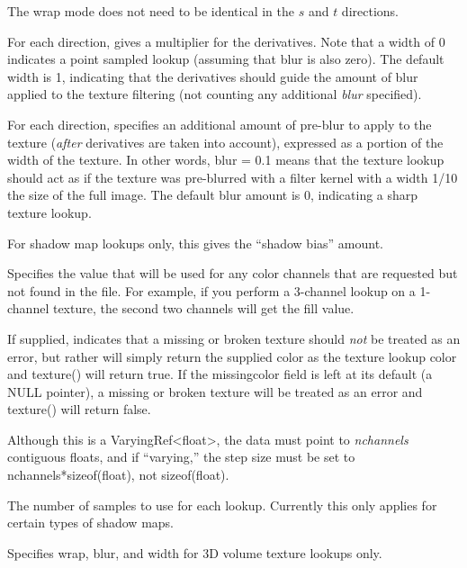 The wrap mode does not need to be identical in the $s$ and $t$
directions.
\apiend

For each direction, gives a multiplier for the derivatives.  Note that
a width of 0 indicates a point sampled lookup (assuming that blur is
also zero).  The default width is 1, indicating that the derivatives
should guide the amount of blur applied to the texture filtering (not
counting any additional \emph{blur} specified).
\apiend

For each direction, specifies an additional amount of pre-blur to apply
to the texture (\emph{after} derivatives are taken into account),
expressed as a portion of the width of the texture.  In other words,
blur = 0.1 means that the texture lookup should act as if the texture
was pre-blurred with a filter kernel with a width 1/10 the size of the
full image.  The default blur amount is 0, indicating a sharp texture
lookup.
\apiend

For shadow map lookups only, this gives the ``shadow bias'' amount.
\apiend

Specifies the value that will be used for any color channels that are
requested but not found in the file.  For example, if you perform a
3-channel lookup on a 1-channel texture, the second two channels will
get the fill value.
\apiend

If supplied, indicates that a missing or broken texture should \emph{not}
be treated as an error, but rather will simply return the supplied color
as the texture lookup color and {\cf texture()} will return {\cf true}.  
If the {\cf missingcolor} field is left at its default (a NULL pointer),
a missing or broken texture will be treated as an error and
{\cf texture()} will return {\cf false}.

Although this is a {\cf VaryingRef<float>}, the data must point to
\emph{nchannels} contiguous floats, and if ``varying,'' the step size must
be set to {\cf nchannels*sizeof(float)}, not {\cf sizeof(float)}.
\apiend

The number of samples to use for each lookup.  Currently this only
applies for certain types of shadow maps.
\apiend

Specifies wrap, blur, and width for 3D volume texture lookups only.
\apiend

